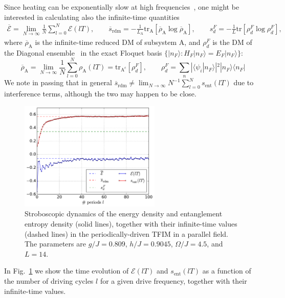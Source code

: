 \documentclass{SciPost}
\newcommand\0{\scalebox{-1}[1]{0}}
\begin{document}
Since heating can be exponentially slow at high frequencies~\cite{abanin_15,kuwahara_16,mori_15,abanin_15_2}, one might be interested in calculating also the infinite-time quantities
\begin{eqnarray}
\overline{\mathcal{E}} = \lim_{N\to\infty}\frac{1}{N}\sum_{l=0}^{N}\mathcal{E}(lT), \qquad
\overline{s}_\mathrm{rdm} = -\frac{1}{L_\mathrm{A}}\mathrm{tr}_\mathrm{A}\left[ \overline{\rho}_\mathrm{A}\log\overline{\rho}_\mathrm{A} \right], \qquad
s_d^F = -\frac{1}{L}\mathrm{tr} \left[ \rho^F_d\log\rho^F_d \right], 
\end{eqnarray}   
where $\overline{\rho}_\mathrm{A}$ is the infinite-time reduced DM of subsystem A, and $\rho^F_d$ is the DM of the Diagonal ensemble~\cite{TD_review} in the exact Floquet basis $\{ |n_F\rangle\!\!: H_F|n_F\rangle=E_F|n_F\rangle \}$:
\begin{equation*}
\overline{\rho}_\mathrm{A} = \lim_{N\to\infty}\frac{1}{N}\sum_{l=0}^{N}\rho_\mathrm{A}(lT)= \mathrm{tr}_\mathrm{A^c}\left[\rho_d^F\right], \qquad
\rho_d^F = \sum_{n} |\langle \psi_i|n_F\rangle |^2 |n_F\rangle\langle n_F|
\end{equation*}
We note in passing that in general $\overline{s}_\mathrm{rdm}\neq \lim_{N\to\infty}N^{-1}\sum_{l=0}^{N}s_\mathrm{ent}(lT)$ due to interference terms, although the two may happen to be close.

\begin{figure}
	\centering
	\includegraphics[width=0.6\textwidth]{example2.pdf}
	\caption{Stroboscopic dynamics of the energy density and entanglement entropy density (solid lines), together with their infinite-time values (dashed lines) in the periodically-driven TFIM in a parallel field. The parameters are $g/J=0.809$, $h/J=0.9045$, $\Omega/J=4.5$, and $L=14$.}
	\label{fig:example2}
\end{figure}

In Fig.~\ref{fig:example2} we show the time evolution of $\mathcal{E}(lT)$ and $s_\mathrm{ent}(lT)$ as a function of the number of driving cycles $l$ for a given drive frequency, together with their infinite-time values.
\end{document}
